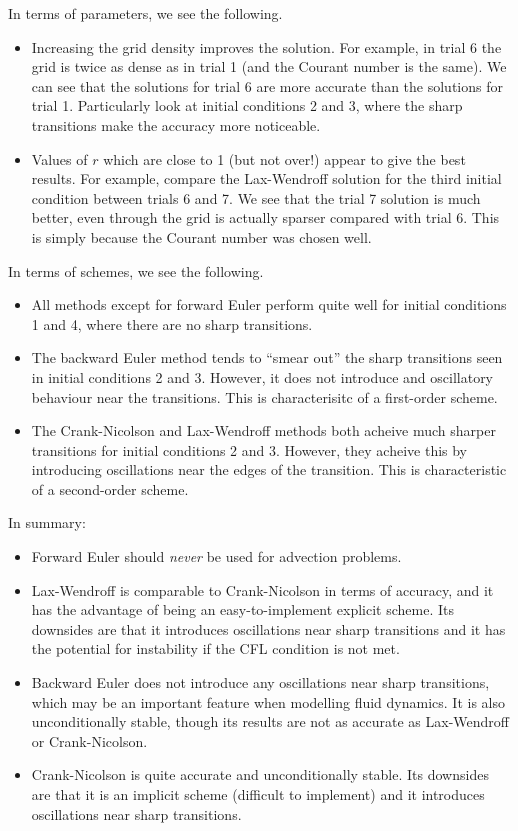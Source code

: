 \documentclass[twocolumn]{myarticle}
\begin{document}
In terms of parameters, we see the following.
\begin{itemize}
\item
    Increasing the grid density improves the solution.
    For example, in trial 6 the grid is twice as dense as in trial 1 (and the Courant number is the same).
    We can see that the solutions for trial 6 are more accurate than the solutions for trial 1.
    Particularly look at initial conditions 2 and 3, where the sharp transitions make the accuracy more noticeable.
\item
    Values of $ r $ which are close to 1 (but not over!) appear to give the best results.
    For example, compare the Lax-Wendroff solution for the third initial condition between trials 6 and 7.
    We see that the trial 7 solution is much better, even through the grid is actually sparser compared with trial 6.
    This is simply because the Courant number was chosen well.
\end{itemize}

In terms of schemes, we see the following.
\begin{itemize}
\item
    All methods except for forward Euler perform quite well for initial conditions 1 and 4, where there are no sharp transitions.
\item
    The backward Euler method tends to ``smear out'' the sharp transitions seen in initial conditions 2 and 3.
    However, it does not introduce and oscillatory behaviour near the transitions.
    This is characterisitc of a first-order scheme.
\item
    The Crank-Nicolson and Lax-Wendroff methods both acheive much sharper transitions for initial conditions 2 and 3.
    However, they acheive this by introducing oscillations near the edges of the transition.
    This is characteristic of a second-order scheme.
\end{itemize}

In summary:
\begin{itemize}
\item
    Forward Euler should \emph{never} be used for advection problems.
\item
    Lax-Wendroff is comparable to Crank-Nicolson in terms of accuracy, and it has the advantage of being an easy-to-implement explicit scheme.
    Its downsides are that it introduces oscillations near sharp transitions and it has the potential for instability if the CFL condition is not met.
\item
    Backward Euler does not introduce any oscillations near sharp transitions, which may be an important feature when modelling fluid dynamics.
    It is also unconditionally stable, though its results are not as accurate as Lax-Wendroff or Crank-Nicolson.
\item
    Crank-Nicolson is quite accurate and unconditionally stable.
    Its downsides are that it is an implicit scheme (difficult to implement) and it introduces oscillations near sharp transitions.
\end{itemize}
\end{document}
